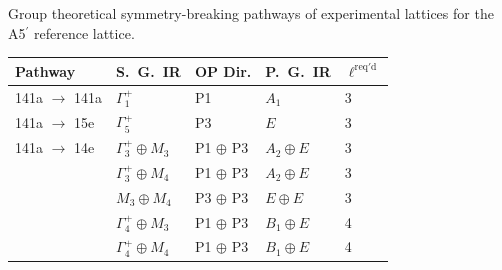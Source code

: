 \documentclass[preprint]{iucr}              %
\begin{document}
\begin{table}
{Group theoretical symmetry-breaking pathways of experimental lattices
for the A5$^\prime$ reference lattice.} \label{pathwaysA5}
\begin{tabular}{lllll}\hline
Pathway & S.~G.~IR & OP Dir. & P.~G.~IR & $\ell^{\mathrm{req'd}}$  \\
\hline
141a $\rightarrow$ 141a & $\Gamma_1^+$ &  P1 & $A_{1}$ & 3 \\
141a $\rightarrow$ 15e & $\Gamma_5^+$ &  P3 & $E$ & 3 \\
141a $\rightarrow$ 14e & $\Gamma_3^+ \oplus M_3 $ &  P1 $\oplus$ P3 & $A_{2} \oplus E $ & 3 \\
& $\Gamma_3^+ \oplus M_4 $ &  P1 $\oplus$ P3 & $A_{2} \oplus E$ &  3\\
& $M_3 \oplus M_4 $ &  P3 $\oplus$ P3 & $E \oplus E$ &  3\\
&  $\Gamma_4^+ \oplus M_3 $ &  P1 $\oplus$ P3 & $B_{1} \oplus E$ &  4\\
& $\Gamma_4^+ \oplus M_4 $ &  P1 $\oplus$ P3 & $B_{1} \oplus E$ &  4\\
\hline
\end{tabular}
\end{table}
\end{document}
